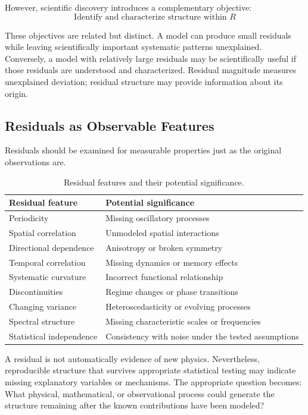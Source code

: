However, scientific discovery introduces a complementary objective: 
\begin{equation*}\boxed{\text{Identify and characterize structure within }R}\end{equation*}

These objectives are related but distinct.
A model can produce small residuals while leaving scientifically important systematic patterns unexplained.
Conversely, a model with relatively large residuals may be scientifically useful if those residuals are understood and characterized.
Residual magnitude measures unexplained deviation; residual structure may provide information about its origin.
\subsection{Residuals as Observable Features}
Residuals should be examined for measurable properties just as the original observations are.
\begin{table}[tbp]\centering\footnotesize\caption{Residual features and their potential significance.}\label{tab:resfeat}\begin{tabular}{@{}p{}p{}@{}}\toprule
\textbf{Residual feature} & \textbf{Potential significance}\\\midrule
Periodicity & Missing oscillatory processes\\
Spatial correlation & Unmodeled spatial interactions\\
Directional dependence & Anisotropy or broken symmetry\\
Temporal correlation & Missing dynamics or memory effects\\
Systematic curvature & Incorrect functional relationship\\
Discontinuities & Regime changes or phase transitions\\
Changing variance & Heteroscedasticity or evolving processes\\
Spectral structure & Missing characteristic scales or frequencies\\
Statistical independence & Consistency with noise under the tested assumptions\\
\bottomrule\end{tabular}\end{table}
A residual is not automatically evidence of new physics.
Nevertheless, reproducible structure that survives appropriate statistical testing may indicate missing explanatory variables or mechanisms.
The appropriate question becomes:
What physical, mathematical, or observational process could generate the structure remaining after the known contributions have been modeled?

